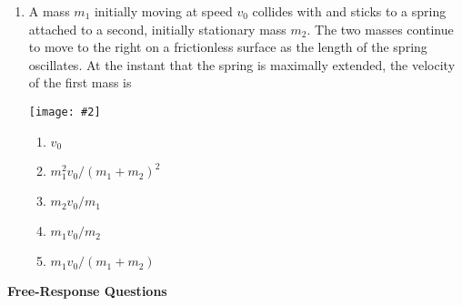 \documentclass[12pt]{article}
\newcommand{\pic}[2]{\texttt{[image: \#2]}}
\begin{document}
\begin{enumerate}[leftmargin=15pt]
\item A mass $m_1$ initially moving at speed $v_0$ collides with and sticks to a
  spring attached to a second, initially stationary mass $m_2$. The two masses
  continue to move to the right on a frictionless surface as the length of the
  spring oscillates. At the instant that the spring is maximally extended, the
  velocity of the first mass is
  \begin{center}
    \pic{0.7}{mass-spring-1.png}
  \end{center}
  \begin{enumerate}[noitemsep,topsep=0pt]
  \item $v_0$
  \item $m_1^2v_0/(m_1+m_2)^2$
  \item $m_2v_0/m_1$
  \item $m_1v_0/m_2$
  \item $m_1v_0/(m_1+m_2)$
  \end{enumerate}
\end{enumerate}
\newpage

\textbf{Free-Response Questions}
\end{document}
